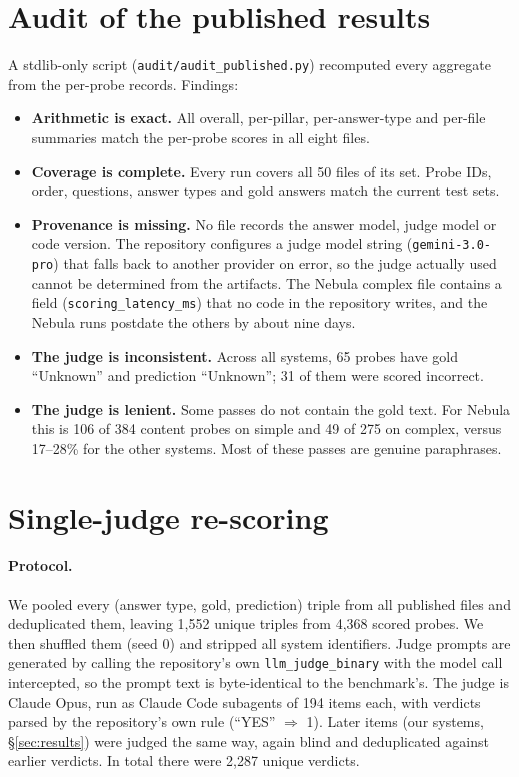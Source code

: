 \documentclass[11pt]{article}
\begin{document}
\section{Audit of the published results}\label{sec:audit}
A stdlib-only script (\texttt{audit/audit\_published.py}) recomputed every aggregate from the per-probe records. Findings:
\begin{itemize}
\item \textbf{Arithmetic is exact.} All overall, per-pillar, per-answer-type and per-file summaries match the per-probe scores in all eight files.
\item \textbf{Coverage is complete.} Every run covers all 50 files of its set. Probe IDs, order, questions, answer types and gold answers match the current test sets.
\item \textbf{Provenance is missing.} No file records the answer model, judge model or code version. The repository configures a judge model string (\texttt{gemini-3.0-pro}) that falls back to another provider on error, so the judge actually used cannot be determined from the artifacts. The Nebula complex file contains a field (\texttt{scoring\_latency\_ms}) that no code in the repository writes, and the Nebula runs postdate the others by about nine days.
\item \textbf{The judge is inconsistent.} Across all systems, 65 probes have gold ``Unknown'' and prediction ``Unknown''; 31 of them were scored incorrect.
\item \textbf{The judge is lenient.} Some passes do not contain the gold text. For Nebula this is 106 of 384 content probes on simple and 49 of 275 on complex, versus 17--28\% for the other systems. Most of these passes are genuine paraphrases.
\end{itemize}

\section{Single-judge re-scoring}\label{sec:rejudge}
\paragraph{Protocol.} We pooled every (answer type, gold, prediction) triple from all published files and deduplicated them, leaving 1{,}552 unique triples from 4{,}368 scored probes. We then shuffled them (seed 0) and stripped all system identifiers. Judge prompts are generated by calling the repository's own \texttt{llm\_judge\_binary} with the model call intercepted, so the prompt text is byte-identical to the benchmark's. The judge is Claude Opus, run as Claude Code subagents of 194 items each, with verdicts parsed by the repository's own rule (``YES'' $\Rightarrow$ 1). Later items (our systems, \S\ref{sec:results}) were judged the same way, again blind and deduplicated against earlier verdicts. In total there were 2{,}287 unique verdicts.
\end{document}
